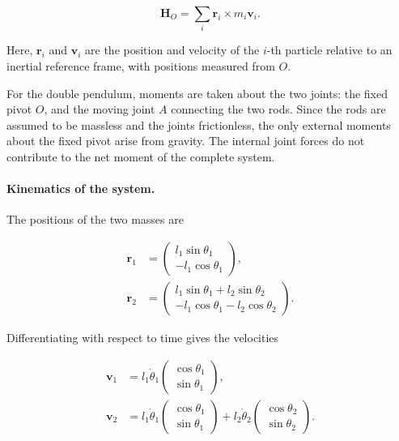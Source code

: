 \begin{equation}
    \mathbf{H}_O
    =
    \sum_i \mathbf{r}_i \times m_i\mathbf{v}_i.
\end{equation}

Here, \(\mathbf{r}_i\) and \(\mathbf{v}_i\) are the position and velocity of the \(i\)-th particle relative to an inertial reference frame, with positions measured from \(O\).

For the double pendulum, moments are taken about the two joints: the fixed pivot \(O\), and the moving joint \(A\) connecting the two rods. Since the rods are assumed to be massless and the joints frictionless, the only external moments about the fixed pivot arise from gravity. The internal joint forces do not contribute to the net moment of the complete system.

\paragraph{Kinematics of the system.}

The positions of the two masses are

\begin{align}
    \mathbf{r}_1 &=
    \begin{pmatrix}
        l_1\sin\theta_1\\
        -l_1\cos\theta_1
    \end{pmatrix},\\
    \mathbf{r}_2 &=
    \begin{pmatrix}
        l_1\sin\theta_1+l_2\sin\theta_2\\
        -l_1\cos\theta_1-l_2\cos\theta_2
    \end{pmatrix}.
\end{align}

Differentiating with respect to time gives the velocities

\begin{align}
    \mathbf{v}_1 &=
    l_1\dot{\theta}_1
    \begin{pmatrix}
        \cos\theta_1\\
        \sin\theta_1
    \end{pmatrix},\\
    \mathbf{v}_2 &=
    l_1\dot{\theta}_1
    \begin{pmatrix}
        \cos\theta_1\\
        \sin\theta_1
    \end{pmatrix}
    +
    l_2\dot{\theta}_2
    \begin{pmatrix}
        \cos\theta_2\\
        \sin\theta_2
    \end{pmatrix}.
\end{align}

